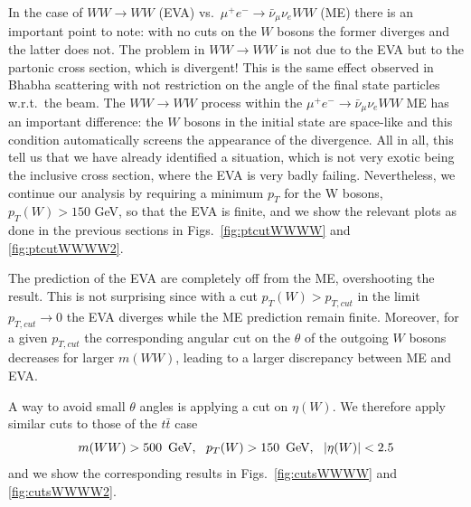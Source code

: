\documentclass[a4paper,11pt]{article}
\begin{document}
In the case of $WW \to WW$ (EVA) vs.~$\mu^+e^-\to\bar \nu_\mu \nu_e WW$ (ME) there is an important point to note: with no cuts on the $W$ bosons the former diverges and the latter does not. The problem in $WW\to WW$ is not due to the EVA but to the partonic cross section, which is divergent! This is the same effect observed in Bhabha scattering with not restriction on the angle of the final state particles w.r.t.~the beam. The $WW\to WW$ process within the $\mu^+e^-\to\bar \nu_\mu \nu_e WW$ ME has an important difference: the $W$ bosons in the initial state are space-like and this condition automatically screens the appearance of the divergence. All in all, this tell us that we have already identified a situation, which is not very exotic being the inclusive cross section, where the EVA is very badly failing. Nevertheless, we continue our analysis by requiring a minimum $p_T$ for the W bosons, $p_T(W)>150$ GeV, so that the EVA is finite, and we show the relevant plots as done in the previous sections in Figs.~\ref{fig:ptcutWWWW} and \ref{fig:ptcutWWWW2}. 

The prediction of the EVA are completely off from the ME, overshooting the result. This is not surprising since with a cut  $p_T(W)>p_{T,cut}$ in the limit $p_{T,cut}\to 0$ the EVA diverges while the ME prediction remain finite. Moreover, for a given $p_{T,cut}$ the corresponding angular cut on the $\theta$ of the outgoing $W$ bosons decreases for larger $m(WW)$, leading to a larger discrepancy between ME and EVA. 

A way to avoid small $\theta$ angles is applying a cut on $\eta(W)$. We therefore apply similar cuts to those of the $t \bar t$ case 
%
\begin{equation}
m(WW) > 500~\,\textrm{GeV}, ~~p_T(W) > 150~\,\textrm{GeV},~~ |\eta(W)|<2.5 
\end{equation}
 and we show the corresponding results in Figs.~\ref{fig:cutsWWWW} and \ref{fig:cutsWWWW2}.
\end{document}
